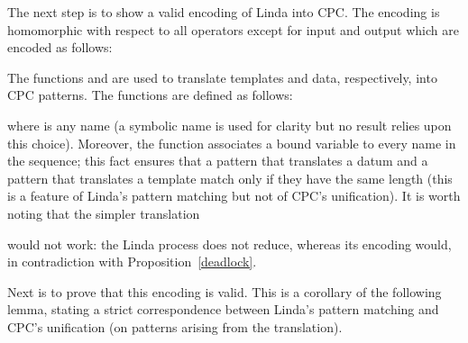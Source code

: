 \documentclass{LMCS}
\begin{document}
The next step is to show a valid encoding of Linda into CPC.
The encoding  is homomorphic with
respect to all operators except for input and output which are encoded as follows:

The functions  and  are used to translate templates and data, respectively, 
into CPC patterns. The functions are defined as follows:

where  is any name (a symbolic name is used for clarity but no result relies upon this choice).
Moreover, the function  associates a bound variable to 
every name in the sequence; this fact ensures that 
a pattern that translates a datum and a pattern that translates 
a template match only if they have the same length (this is a feature
of Linda's pattern matching but not of CPC's unification).
It is worth noting that the simpler translation

would not work: the Linda process 
does not reduce, whereas its encoding would, in contradiction with Proposition~\ref{deadlock}.

Next is  to prove that this encoding is valid. 
This is a corollary of the following lemma, stating a strict 
correspondence between Linda's pattern matching and CPC's unification
(on patterns arising from the translation).
\end{document}
